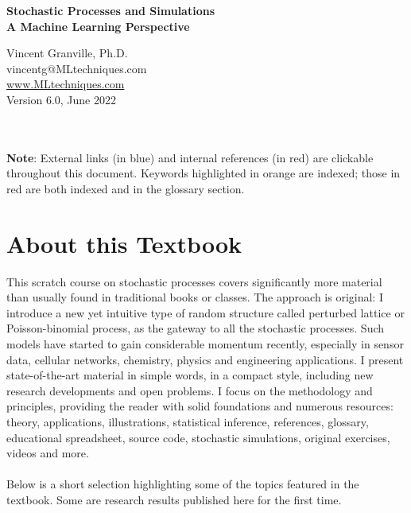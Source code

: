 \documentclass[10pt]{article}
\begin{document}
\hypersetup{linkcolor=blue}


\begin{center}
{\Large \bf{Stochastic Processes and Simulations\\  
 \addvspace{1ex}
A Machine Learning Perspective}} \\ 
\addvspace{5ex}
\end{center}
 
\begin{center}
Vincent Granville, Ph.D.\\
vincentg@MLtechniques.com\\
 \href{https://mltechniques.com/}{www.MLtechniques.com}\\
\quad 
Version 6.0, June 2022
\end{center}
\quad\\ \\
{\bf Note}: External links (in blue) and internal references (in red) are clickable throughout this document. Keywords highlighted in orange are indexed; those in red are both indexed and in the glossary section. 


\hypersetup{linkcolor=red} %
\tableofcontents  %


\hypersetup{linkcolor=red}



\section*{About this Textbook}

This scratch course on stochastic processes covers significantly more material than usually found in traditional books or classes. The approach is original:  I introduce a new yet intuitive type of random structure called perturbed lattice or Poisson-binomial process, 
as the gateway to all the stochastic processes. Such models have started to gain considerable momentum recently, especially in sensor data, cellular networks, chemistry, physics and engineering applications. I present state-of-the-art material in simple words, in a compact style, including new research developments and open problems. I focus on the methodology and principles, providing the reader with solid foundations and numerous resources: theory, applications, illustrations, statistical inference, references, glossary, educational spreadsheet, source code, stochastic simulations, original exercises, videos and more.  \\
\quad \\
Below is a short selection highlighting some of the topics featured in the textbook. Some are research results published here for the first time. \\
\quad \\
\end{document}
